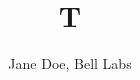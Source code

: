 \documentclass{acmart}
\begin{document}
\title{T}
\author{Jane Doe, Bell Labs}
\maketitle
\end{document}
